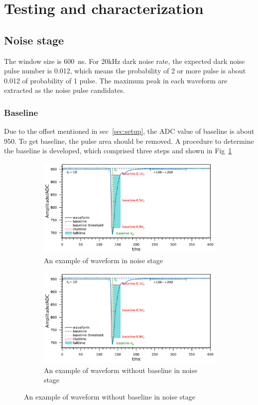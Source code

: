 \section{Testing and characterization}
\label{Result}

\subsection{Noise stage}
The window size is \SI{600}{ns}. For 20kHz dark noise rate, the expected dark noise pulse number is 0.012, which means the probability of 2 or more pulse is about 0.012 of probability of 1 pulse. The maximum peak in each waveform are extracted as the noise pulse candidates.
\subsubsection{Baseline}
Due to the offset mentioned in sec~\ref{sec:setup}, the ADC value of baseline is about 950. To get baseline, the pulse area should be removed. A procedure to determine the baseline is developed, which comprised three steps and shown in Fig~\ref{fig:baseline1}
\begin{figure}[!htbp]
    \centering
    \begin{subfigure}[b]{\textwidth}
        \includegraphics[width=\textwidth,page=1]{figures/result/noisebaseline697_219908_2.pdf}
        \caption{An example of waveform in noise stage}
        \label{fig:baseline1}
    \end{subfigure}
    \begin{subfigure}[b]{\textwidth}
        \includegraphics[width=\textwidth,page=3]{figures/result/noisebaseline697_219908_2.pdf}
        \caption{An example of waveform without baseline in noise stage}
        \label{fig:baseline2}
    \end{subfigure}
\end{figure}

